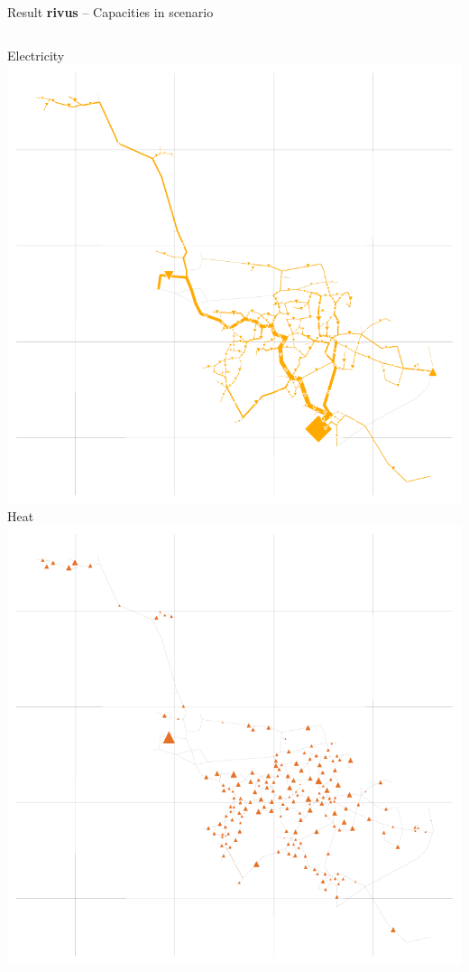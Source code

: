 \begin{frame}{Result \textbf{rivus} -- Capacities in scenario }
    \begin{columns}
        \column{\squeezethree}
        	\centering
        	\textcolor{elec}{Electricity} \vphantom{gÖ}
        	\includegraphics[width=\squeezethree]{img/haag/scenario_renovation-caps-Elec}
        \column{\squeezethree}
        	\centering
        	\textcolor{heat}{Heat} \vphantom{gÖ}
        	\includegraphics[width=\squeezethree]{img/haag/scenario_renovation-caps-Heat}

\end{columns}
\end{frame}
